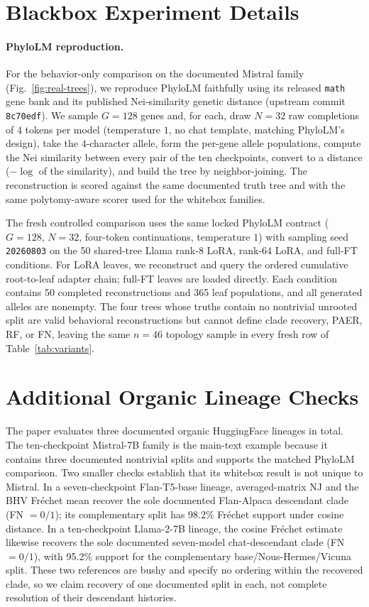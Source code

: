 \documentclass{article}
\theoremstyle{definition}
\theoremstyle{plain}
\begin{document}
\section{Blackbox Experiment Details}
\label{app:blackbox}

\paragraph{PhyloLM reproduction.} For the behavior-only comparison on the documented Mistral family
(Fig.~\ref{fig:real-trees}), we reproduce PhyloLM \citep{yax2025phylolm} faithfully using its released
\texttt{math} gene bank and its published Nei-similarity genetic distance (upstream commit
\texttt{8c70edf}). We sample $G=128$ genes and, for each, draw $N=32$ raw completions of $4$ tokens per
model (temperature $1$, no chat template, matching PhyloLM's design), take the $4$-character allele,
form the per-gene allele populations, compute the Nei similarity between every pair of the ten
checkpoints, convert to a distance ($-\log$ of the similarity), and build the tree by neighbor-joining.
The reconstruction is scored against the same documented truth tree and with the same polytomy-aware
scorer used for the whitebox families.

The fresh controlled comparison uses the same locked PhyloLM contract ($G=128$, $N=32$, four-token
continuations, temperature $1$) with sampling seed \texttt{20260803} on the 50 shared-tree Llama
rank-8 LoRA, rank-64 LoRA, and full-FT conditions. For LoRA leaves, we reconstruct and query the
ordered cumulative root-to-leaf adapter chain; full-FT leaves are loaded directly. Each condition
contains 50 completed reconstructions and 365 leaf populations, and all generated alleles are
nonempty. The four trees whose truths contain no nontrivial unrooted split are valid behavioral
reconstructions but cannot define clade recovery, PAER, RF, or FN, leaving the same $n=46$ topology
sample in every fresh row of Table~\ref{tab:variants}.

\section{Additional Organic Lineage Checks}
\label{app:organic-additional}

The paper evaluates three documented organic HuggingFace lineages in total. The ten-checkpoint
Mistral-7B family is the main-text example because it contains three documented nontrivial splits and
supports the matched PhyloLM comparison. Two smaller checks establish that its whitebox result is not
unique to Mistral. In a seven-checkpoint Flan-T5-base lineage, averaged-matrix NJ and the BHV Fr\'echet
mean recover the sole documented Flan-Alpaca descendant clade (FN $=0/1$); its complementary split has
98.2\% Fr\'echet support under cosine distance. In a ten-checkpoint Llama-2-7B lineage, the cosine
Fr\'echet estimate likewise recovers the sole documented seven-model chat-descendant clade (FN
$=0/1$), with 95.2\% support for the complementary base/Nous-Hermes/Vicuna split. These two references
are bushy and specify no ordering within the recovered clade, so we claim recovery of one documented
split in each, not complete resolution of their descendant histories.
\end{document}

